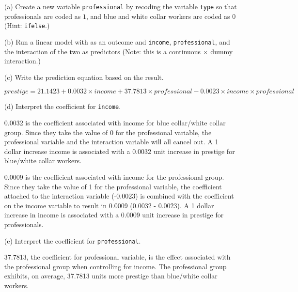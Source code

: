 \documentclass[12pt,letterpaper]{article}
\begin{document}
\newpage
\begin{enumerate}
	
	\item [(a)]
	Create a new variable \texttt{professional} by recoding the variable \texttt{type} so that professionals are coded as $1$, and blue and white collar workers are coded as $0$ (Hint: \texttt{ifelse}.)
	
	 
	
	\item [(b)]
	Run a linear model with  as an outcome and \texttt{income}, \texttt{professional}, and the interaction of the two as predictors (Note: this is a continuous $\times$ dummy interaction.)
	
	 
	
	\item [(c)]
	Write the prediction equation based on the result.
	
$ prestige =  21.1423 + 0.0032 \times income + 37.7813 \times professional - 0.0023 \times income \times professional $
	
	\item [(d)]
	Interpret the coefficient for \texttt{income}.
	
	0.0032 is the coefficient associated with income for blue collar/white collar group. Since they take the value of 0 for the professional variable, the professional variable and the interaction variable will all cancel out. A 1 dollar increase income is associated with a 0.0032 unit increase in prestige for blue/white collar workers.
	
	0.0009 is the coefficient associated with income for the professional group. Since they take the value of 1 for the professional variable, the coefficient attached to the interaction variable (-0.0023) is combined with the coefficient on the income variable to result in 0.0009 (0.0032 - 0.0023). A 1 dollar increase in income is associated with a 0.0009 unit increase in prestige for professionals.
		
	\item [(e)]
	Interpret the coefficient for \texttt{professional}.
	
	37.7813, the coefficient for professional variable,  is the effect associated with the professional group when controlling for income. The professional group exhibits, on average, 37.7813 units more prestige than blue/white collar workers.
	

\end{enumerate}
\end{document}
